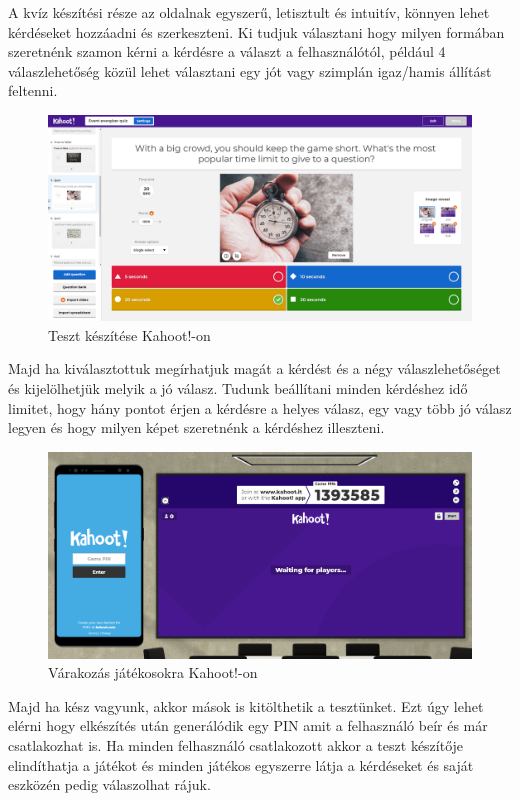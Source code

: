 A kvíz készítési része az oldalnak egyszerű, letisztult és intuitív, könnyen lehet kérdéseket hozzáadni és szerkeszteni. Ki tudjuk választani hogy milyen formában szeretnénk szamon kérni a kérdésre a választ a felhasználótól, például 4 válaszlehetőség közül lehet választani egy jót vagy szimplán igaz/hamis állítást feltenni.

\begin{figure}[h]
  \centering
  \includegraphics[width=\linewidth]{images/kahoot_test_making.PNG}
  \caption{Teszt készítése Kahoot!-on}
\end{figure}

Majd ha kiválasztottuk megírhatjuk magát a kérdést és a négy válaszlehetőséget és kijelölhetjük melyik a jó válasz. Tudunk beállítani minden kérdéshez idő limitet, hogy hány pontot érjen a kérdésre a helyes válasz, egy vagy több jó válasz legyen és hogy milyen képet szeretnénk a kérdéshez illeszteni.


\begin{figure}[h]
  \centering
  \includegraphics[width=\textwidth]{images/kahoot_play.png}
  \caption{Várakozás játékosokra Kahoot!-on}
\end{figure}
Majd ha kész vagyunk, akkor mások is kitölthetik a tesztünket. Ezt úgy lehet elérni hogy elkészítés után generálódik egy PIN amit a felhasználó beír és már csatlakozhat is. Ha minden felhasználó csatlakozott akkor a teszt készítője elindíthatja a játékot és minden játékos egyszerre látja a kérdéseket és saját eszközén pedig válaszolhat rájuk.


